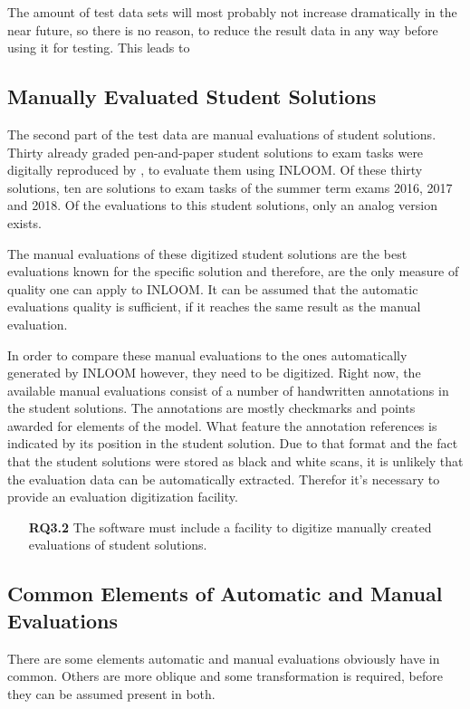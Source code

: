 The amount of test data sets will most probably not increase dramatically in the near future,
so there is no reason, to reduce the result data in any way before using it for testing.
This leads to 

\subsection{Manually Evaluated Student Solutions}
The second part of the test data are manual evaluations of student solutions. Thirty already
graded pen-and-paper student solutions to exam tasks were digitally reproduced by \cite{1}, to 
evaluate them using INLOOM. Of these thirty solutions, ten are solutions to exam tasks of the
summer term exams 2016, 2017 and 2018. Of the evaluations to this student solutions, only an 
analog version exists.

The manual evaluations of these digitized student solutions are the best evaluations known for
the specific solution and therefore, are the only measure of quality one can apply to INLOOM. 
It can be assumed that the automatic evaluations quality is sufficient, if it reaches the same
result as the manual evaluation. 

In order to compare these manual evaluations to the ones automatically generated by INLOOM 
however, they need to be digitized. Right now, the available manual evaluations consist of
a number of handwritten annotations in the student solutions. The annotations are mostly 
checkmarks and points awarded for elements of the model. What feature the annotation references
is indicated by its position in the student solution. Due to that format and the fact that the
student solutions were stored as black and white scans, it is unlikely that the evaluation data
can be automatically extracted. Therefor it's necessary to provide an evaluation digitization
facility.

\begin{itemize}
    \item[\textbf{RQ3.2}] The software must include a facility to digitize manually created 
    evaluations of student solutions. 
\end{itemize}

\subsection{Common Elements of Automatic and Manual Evaluations}
There are some elements automatic and manual evaluations obviously have in common. Others are
more oblique and some transformation is required, before they can be assumed present in both. 

